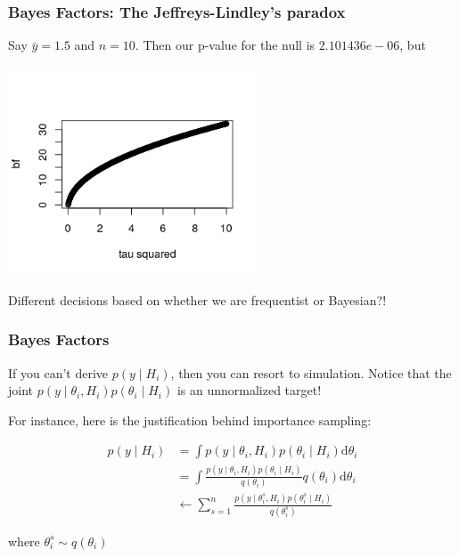 \documentclass{beamer}
\begin{document}
\begin{frame}[fragile]
\frametitle{Bayes Factors: The Jeffreys-Lindley's paradox}

Say $\bar{y} = 1.5$ and $n = 10$. Then our p-value for the null is $2.101436e-06$, but 
\begin{center}
\includegraphics[width=75mm]{jf_paradox.png}
\end{center}

Different decisions based on whether we are frequentist or Bayesian?!




\end{frame}

\begin{frame}
\frametitle{Bayes Factors}

If you can't derive $p(y \mid H_i)$, then you can resort to simulation. Notice that the joint $p(y \mid \theta_i, H_i)p(\theta_i \mid H_i)$ is an unnormalized target!
\newline

For instance, here is the justification behind importance sampling:

\begin{align*}
p(y \mid H_i) &= \int p(y \mid \theta_i, H_i)p(\theta_i \mid H_i) \text{d}\theta_i \\
&= \int \frac{p(y \mid \theta_i, H_i)p(\theta_i \mid H_i)}{q(\theta_i)}q(\theta_i) \text{d}\theta_i \\
&\leftarrow \sum_{s=1}^n \frac{p(y \mid \theta^s_i, H_i)p(\theta^s_i \mid H_i)}{q(\theta^s_i)}
\end{align*}

where $\theta^s_i \sim q(\theta_i)$
\end{frame}
\end{document}
